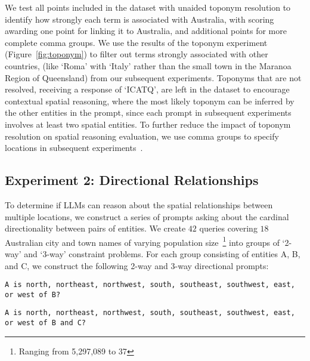 \noindent We test all points included in the dataset with unaided toponym resolution to identify how strongly each term is associated with Australia, with scoring awarding one point for linking it to Australia, and additional points for more complete comma groups.
We use the results of the toponym experiment (Figure~\ref{fig:toponym}) to filter out terms strongly associated with other countries, (like `Roma' with `Italy' rather than the small town in the Maranoa Region of Queensland) from our subsequent experiments. 
Toponyms that are not resolved, receiving a response of `ICATQ', are left in the dataset to encourage contextual spatial reasoning, where the most likely toponym can be inferred by the other entities in the prompt, since each prompt in subsequent experiments involves at least two spatial entities.
To further reduce the impact of toponym resolution on spatial reasoning evaluation, we use comma groups to specify locations in subsequent experiments~\cite{Lieberman2010}.






\subsection{Experiment 2: Directional Relationships}

To determine if LLMs can reason about the spatial relationships between multiple locations, we construct a series of prompts asking about the cardinal directionality between pairs of entities.
We create $42$ queries covering $18$ Australian city and town names of varying population size~\footnote{Ranging from 5,297,089 to 37} into groups of `2-way' and `3-way' constraint problems.
For each group consisting of entities A, B, and C, we construct the following 2-way and 3-way directional prompts: 

\begin{lstlisting}[title=Prompt 3: 2-way Directional Prompt]
    A is north, northeast, northwest, south, southeast, southwest, east, or west of B?
\end{lstlisting}

\begin{lstlisting}[title=Prompt 4: 3-way Directional Prompt]
    A is north, northeast, northwest, south, southeast, southwest, east, or west of B and C?
\end{lstlisting}


